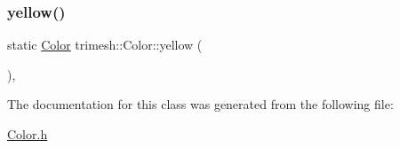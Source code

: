\mbox{\label{classtrimesh_1_1Color_ac6156bc948dc531550cef3b86137b5b0}} 
\subsubsection{\texorpdfstring{yellow()}{yellow()}}
{\footnotesize\ttfamily static \hyperlink{classtrimesh_1_1Color}{Color} trimesh\+::\+Color\+::yellow (\begin{DoxyParamCaption}{ }\end{DoxyParamCaption})\hspace{0.3cm}{\ttfamily [inline]}, {\ttfamily [static]}}



The documentation for this class was generated from the following file\+:\begin{DoxyCompactItemize}
\item 
\hyperlink{Color_8h}{Color.\+h}\end{DoxyCompactItemize}
